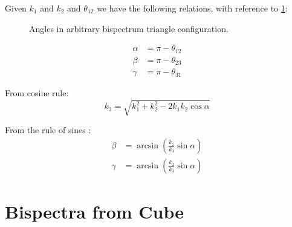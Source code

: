 Given $k_1$ and $k_2$ and $\theta_{12}$ we have the following relations, with reference to \cref{fig:data:verification:bispectrum_angles}:

\begin{figure}
  \centering
  \caption{Angles in arbitrary bispectrum triangle configuration.}
  \label{fig:data:verification:bispectrum_angles}
  
\end{figure}

\begin{equation}
  \begin{split}
    \alpha &= \pi-\theta_{12}\\
    \beta &= \pi-\theta_{23}\\
    \gamma &= \pi-\theta_{31}
  \end{split}
\end{equation}

From cosine rule:
\begin{equation}
  k_3 = \sqrt{k_1^2 + k_2^2 - 2k_1k_2\cos\alpha}
\end{equation}

From the rule of sines :
\begin{equation}
  \begin{split}
    \beta &= \arcsin\left(\frac{k_1}{k_3}\sin\alpha\right)\\
    \gamma &= \arcsin\left(\frac{k_2}{k_3}\sin\alpha\right)
  \end{split}
\end{equation}


\section{Bispectra from Cube}

